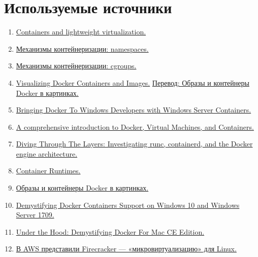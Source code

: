 \documentclass[14pt, a4paper]{article}
\begin{document}
\section*{Используемые источники}

\begin{enumerate}
    \item \href{https://lwn.net/Articles/179361/}{Containers and lightweight virtualization.}
    \item \href{https://blog.selectel.ru/mexanizmy-kontejnerizacii-namespaces/}{Механизмы контейнеризации: namespaces.}
    \item \href{https://blog.selectel.ru/mexanizmy-kontejnerizacii-cgroups/}{Механизмы контейнеризации: cgroups.}
    \item \href{http://merrigrove.blogspot.com/2015/10/visualizing-docker-containers-and-images.html}{Visualizing Docker Containers and Images.}
    \href{https://habr.com/ru/post/272145/}{Перевод: Образы и контейнеры Docker в картинках.}
    \item \href{https://docs.microsoft.com/en-us/archive/msdn-magazine/2017/april/containers-bringing-docker-to-windows-developers-with-windows-server-containers}{Bringing Docker To Windows Developers with Windows Server Containers.}
    \item \href{https://medium.com/free-code-camp/comprehensive-introductory-guide-to-docker-vms-and-containers-4e42a13ee103}{A comprehensive introduction to Docker, Virtual Machines, and Containers.}
    \item \href{https://www.slideshare.net/PhilEstes/diving-through-the-layers-investigating-runc-containerd-and-the-docker-engine-architecture}{Diving Through The Layers: Investigating runc, containerd, and the Docker engine architecture.}
    \item \href{https://www.slideshare.net/nmeisenzahl/docker-meetup-rosenheim-container-runtimes}{Container Runtimes.}
    \item \href{https://habr.com/ru/post/272145/}{Образы и контейнеры Docker в картинках.}
    \item \href{https://medium.com/@waelkdouh/demystifying-docker-containers-support-on-windows-10-and-windows-server-2016-592f1c09a5e1}{Demystifying Docker Containers Support on Windows 10 and Windows Server 1709.}
    \item \href{http://collabnix.com/how-docker-for-mac-works-under-the-hood/}{Under the Hood: Demystifying Docker For Mac CE Edition.}
    \item \href{https://habr.com/ru/company/flant/blog/431192/}{В AWS представили Firecracker — «микровиртуализацию» для Linux.}

\end{enumerate}
\end{document}

